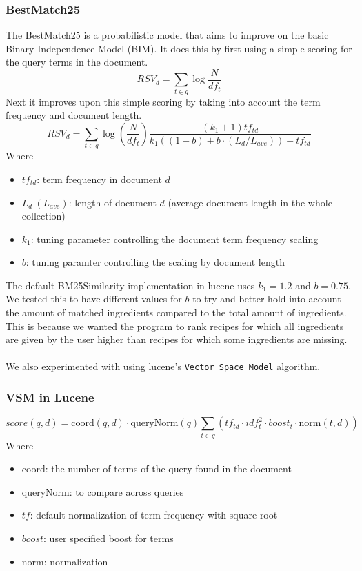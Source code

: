 \documentclass{article}
\begin{document}
\subsubsection{BestMatch25}
The BestMatch25 is a probabilistic model that aims to improve on the basic
Binary Independence Model (BIM). It does this by first using a simple scoring
for the query terms in the document.
$$RSV_d=\displaystyle\sum_{t\in q}\log \frac{N}{df_t}$$
Next it improves upon this simple scoring by taking into account the term
frequency and document length.
$$RSV_d=\displaystyle\sum_{t\in q}\log \left(\frac{N}{df_t}\right) \frac{(k_1 + 1) tf_{td}}{k_1((1 - b) + b \cdot (L_d/L_{ave}))+tf_{td}}$$
Where \begin{itemize}
    \item $tf_{td}$: term frequency in document $d$
    \item $L_d\ (L_{ave})$: length of document $d$ (average document length in the whole collection)
    \item $k_1$: tuning parameter controlling the document term frequency scaling
    \item $b$: tuning paramter controlling the scaling by document length
\end{itemize}
The default BM25Similarity implementation in lucene uses $k_1 = 1.2$ and $b=0.75$.
We tested this to have different values for $b$ to try and better hold into account
the amount of matched ingredients compared to the total amount of ingredients.
This is because we wanted the program to rank recipes for which all ingredients are
given by the user higher than recipes for which some ingredients are missing.
\\~\\
We also experimented with using lucene's \texttt{Vector Space Model} algorithm.
\subsubsection{VSM in Lucene}
$$score(q,d) = \text{coord}(q,d) \cdot \text{queryNorm}(q) \displaystyle \sum_{t\in q}\left(tf_{td} \cdot idf_t^2 \cdot boost_t \cdot \text{norm}(t,d)\right)$$
Where \begin{itemize}
    \item coord: the number of terms of the query found in the document
    \item queryNorm: to compare across queries
    \item $tf$: default normalization of term frequency with square root
    \item $boost$: user specified boost for terms
    \item norm: normalization
\end{itemize}
\end{document}
